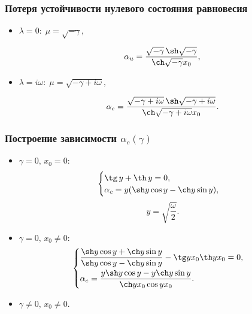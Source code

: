 \documentclass[fullscreen=true, unicode, bookmarks=false]{beamer}
\begin{document}
\begin{frame}
\frametitle{ Потеря устойчивости нулевого состояния равновесия }

\begin{itemize}

\item { $ \lambda = 0: \; \mu = \sqrt{-\gamma}, $ 
}

\begin{equation}
	\alpha_u = \dfrac{ \sqrt{-\gamma} \, \sh \sqrt{-\gamma} }{ \ch \sqrt{-\gamma} x_0 }, 
\end{equation}

\vfill
\pause

\item { $ \lambda = i \omega: \; \mu = \sqrt{-\gamma + i \omega}, $ 
}

\begin{equation}
	\alpha_c = \frac{ \sqrt{-\gamma + i \omega} \, \sh \sqrt{-\gamma + i \omega} }{ \ch \sqrt{-\gamma + i \omega} x_0 }.
\end{equation}

\end{itemize}	

\end{frame}

\begin{frame}
\frametitle{ Построение зависимости $ \alpha_c(\gamma) $ }
 
\begin{itemize}

\item { $ \gamma = 0, \, x_0 = 0: $ 
\begin{equation}
 \begin{cases}
   \tg \, y + \th \, y = 0, 
   \\
   \alpha_c = y(\sh y \cos y - \ch y \sin y),
 \end{cases}
\end{equation}
$$ y = \sqrt{ \frac{\omega}{2} }. $$
}

\pause

\item { $ \gamma = 0, \, x_0 \neq 0: $ 
\begin{equation}
 \begin{cases}
   \dfrac{\sh y \cos y + \ch y \sin y}{\sh y \cos y - \ch y \sin y} - \tg y x_0 \th y x_0 = 0, 
   \vspace{0.1cm}
   \\ 
   \alpha_c = \dfrac{y \sh y \cos y - y \ch y \sin y}{\ch y x_0 \cos y x_0}.
 \end{cases}
\end{equation}
}

\pause

\item { $ \gamma \neq 0, \, x_0 \neq 0. $ 
}

\end{itemize}	

\end{frame}
\end{document}
